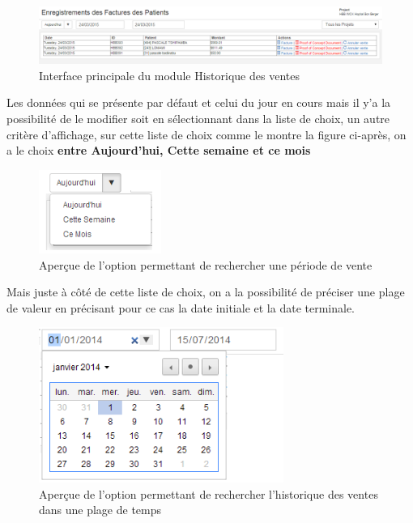 \documentclass[12pt,a4paper]{report}
\begin{document}
\begin{figure}[h]
\begin{center}
\includegraphics[width=14cm]{pic/HistoVente.png}
\end{center}
\caption{Interface principale du module Historique des ventes}
\label{Interface principale du module Historique des ventes}
\end{figure}

Les données qui se présente par défaut et celui du jour en cours mais il y'a la possibilité de le modifier soit en sélectionnant dans la liste de choix, un autre critère d'affichage, sur cette liste de choix comme le montre la figure ci-après, on a le choix \textbf{entre Aujourd'hui, Cette semaine et ce mois} 


\begin{figure}[h]
\begin{center}
\includegraphics[width=4cm]{pic/SelectJour.png}
\end{center}
\caption{Aperçue de l'option permettant de rechercher une période de vente}
\label{Aperçue de l'option permettant de rechercher une période de vente}
\end{figure}

Mais juste à côté de cette liste de choix, on a la possibilité de préciser une plage de valeur en précisant pour ce cas la date initiale et la date terminale.

\begin{figure}[h]
\begin{center}
\includegraphics[width=8cm]{pic/SelectPlageValeur.png}
\end{center}
\caption{Aperçue de l'option permettant de rechercher l'historique des ventes dans une plage de temps}
\label{Aperçue de l'option permettant de rechercher l'historique des ventes dans une plage de temps}
\end{figure}
\end{document}
